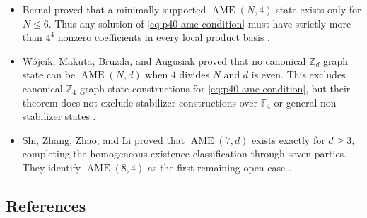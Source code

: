 \begin{itemize}
  \item Bernal proved that a minimally supported $\operatorname{AME}(N,4)$
  state exists only for $N\leq 6$.  Thus any solution of
  \eqref{eq:p40-ame-condition} must have strictly more than $4^{4}$ nonzero
  coefficients in every local product basis
  .

  \item W\'ojcik, Makuta, Bruzda, and Augusiak proved that no canonical
  $\mathbb{Z}_{d}$ graph state can be $\operatorname{AME}(N,d)$ when $4$
  divides $N$ and $d$ is even.  This excludes canonical $\mathbb{Z}_{4}$
  graph-state constructions for \eqref{eq:p40-ame-condition}, but their
  theorem does not exclude stabilizer constructions over $\mathbb{F}_{4}$ or
  general non-stabilizer states
  .

  \item Shi, Zhang, Zhao, and Li proved that
  $\operatorname{AME}(7,d)$ exists exactly for $d\geq 3$, completing the
  homogeneous existence classification through seven parties.  They identify
  $\operatorname{AME}(8,4)$ as the first remaining open case
  .
\end{itemize}

\subsection*{References}

